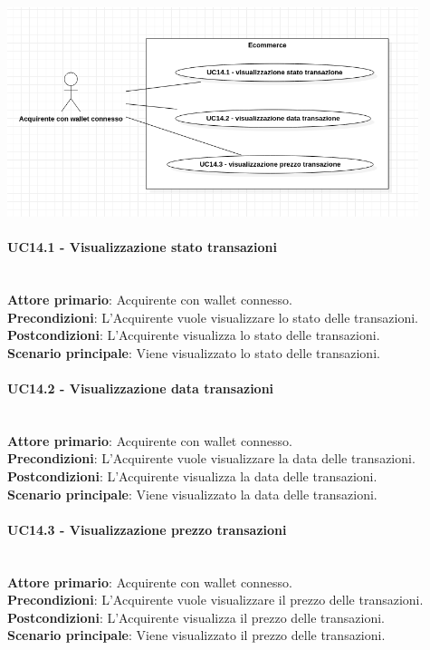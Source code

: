 \documentclass[a4paper, 12pt]{article}
\begin{document}
\includegraphics[width=0.9\textwidth]{UC14D}

\paragraph{UC14.1 - Visualizzazione stato transazioni}\\
\textbf{Attore primario}: Acquirente con wallet connesso.\\
\textbf{Precondizioni}: L'Acquirente vuole visualizzare lo stato delle transazioni.\\
\textbf{Postcondizioni}: L'Acquirente visualizza lo stato delle transazioni.\\
\textbf{Scenario principale}: Viene visualizzato lo stato delle transazioni.\\

\paragraph{UC14.2 - Visualizzazione data transazioni}\\
\textbf{Attore primario}: Acquirente con wallet connesso.\\
\textbf{Precondizioni}: L'Acquirente vuole visualizzare la data delle transazioni.\\
\textbf{Postcondizioni}: L'Acquirente visualizza la data delle transazioni.\\
\textbf{Scenario principale}: Viene visualizzato la data delle transazioni.\\

\paragraph{UC14.3 - Visualizzazione prezzo transazioni}\\
\textbf{Attore primario}: Acquirente con wallet connesso.\\
\textbf{Precondizioni}: L'Acquirente vuole visualizzare il prezzo delle transazioni.\\
\textbf{Postcondizioni}: L'Acquirente visualizza il prezzo delle transazioni.\\
\textbf{Scenario principale}: Viene visualizzato il prezzo delle transazioni.\\
\end{document}
